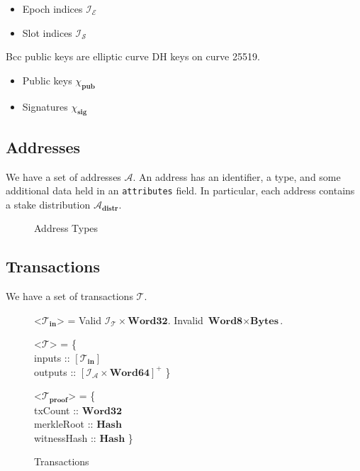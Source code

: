 \documentclass{article}
\def\fld{\\\llap{,\quad}}%
\newcommand{\rhu}{\rightharpoonup}
\newcommand{\lists}[1]{\left[{#1}\right]}
\newcommand{\nelists}[1]{\left[{#1}\right]^+}
\newcommand{\maybe}[1]{$()$ | {#1}}
\newcommand{\idsof}[1]{\mathcal{I}\!_#1}
\newcommand{\txids}{\idsof{\txs}}
\newcommand{\agentids}{\idsof{\agents}}
\newcommand{\epochids}{\idsof{\mathcal{E}}}
\newcommand{\slotids}{\idsof{\mathcal{S}}}
\newcommand{\pubkey}{\chi_{\textbf{pub}}}
\newcommand{\signature}{\chi_{\textbf{sig}}}
\newcommand{\agents}{\mathcal{A}}
\newcommand{\txs}{\mathcal{T}}
\newcommand{\txins}{\txs_{\textbf{in}}}
\newcommand{\txpf}{\txs_{\textbf{proof}}}
\newcommand{\hstype}[1]{\textbf{#1}}
\newcommand{\Word}[1]{\hstype{Word#1}}
\newcommand{\hash}{\hstype{Hash}}
\newcommand{\Bytes}{\hstype{Bytes}}
\begin{document}
\begin{itemize}
\item Epoch indices $\epochids$
\item Slot indices $\slotids$
\end{itemize}

Bcc public keys are elliptic curve DH keys on curve 25519.

\begin{itemize}
\item Public keys $\pubkey$
\item Signatures $\signature$
\end{itemize}

\subsection{Addresses}

We have a set of addresses $\agents$. An address has an identifier, a type, and
some additional data held in an \verb|attributes| field. In particular, each
address contains a stake distribution $\agents_{\textbf{distr}}$.

\begin{figure}[H]

  \caption{Address Types}
\end{figure}

\subsection{Transactions}

We have a set of transactions $\txs$.

\begin{figure}[H]
  \caption{Transactions}
  \label{fig:txin}
  \begin{grammar}
    <$\txins$> = Valid $\txids\times\Word{32}$.
    \alt Invalid $\Word{8}\times\Bytes$.

    <$\txs$> = \{
    \fld inputs :: $\lists{\txins}$
    \fld outputs :: $\nelists{\agentids \times \Word{64}}$
    \}

    <$\txpf$> = \{
    \fld txCount :: $\Word{32}$
    \fld merkleRoot :: $\hash$
    \fld witnessHash :: $\hash$
    \}
  \end{grammar}
\end{figure}
\end{document}
